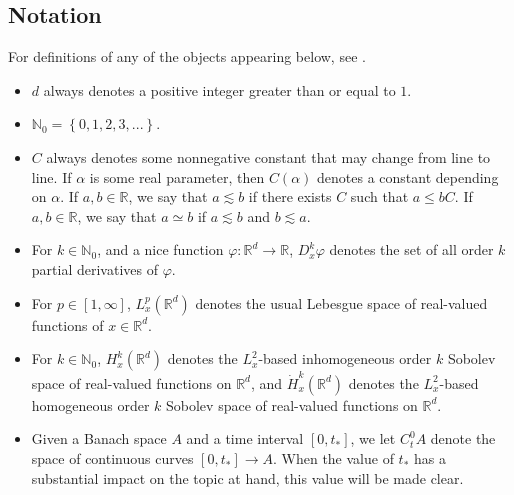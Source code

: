 \documentclass[twosided, 12pt]{article}
\numberwithin{equation}{section}
\theoremstyle{plain}
\begin{document}
\subsection{Notation}
\noindent For definitions of any of the objects appearing below, see \cite{Evans2010}.  
\begin{itemize}
\item $d$ always denotes a positive integer greater than or equal to $1$. 
\item $\mathbb{N}_0=\left\{0,1,2,3,...\right\}$.
\item $C$ always denotes some nonnegative constant that may change from line to line. If $\alpha$ is some real parameter, then $C(\alpha)$ denotes a constant depending on $\alpha$. If $a,b\in \mathbb{R}$, we say that $a\lesssim b$ if there exists $C$ such that $a\leq bC$. If $a,b\in \mathbb{R}$, we say that $a\simeq b$ if $a\lesssim b$ and $b\lesssim a$. 
\item For $k\in \mathbb{N}_0$, and a nice function $\varphi\colon \mathbb{R}^d\rightarrow \mathbb{R}$, $D^{k}_{x}\varphi$ denotes the set of all order $k$ partial derivatives of $\varphi$. 
    \item For $p\in \left[1,\infty\right]$, $L^{p}_{x}\left(\mathbb{R}^{d}\right)$ denotes the usual Lebesgue space of real-valued functions of $x\in \mathbb{R}^d$. 
   \item For $k\in \mathbb{N}_0$, $H^{k}_{x}\left(\mathbb{R}^d\right)$ denotes the $L^2_{x}$-based inhomogeneous order $k$ Sobolev space of real-valued functions on $\mathbb{R}^d$, and $\dot{H}^{k}_{x}\left(\mathbb{R}^d\right)$ denotes the $L^2_{x}$-based homogeneous order $k$ Sobolev space of real-valued functions on $\mathbb{R}^d$. 
   \item Given a Banach space $A$ and a time interval $[0,t_{*}]$, we let $C^0_t A$ denote the space of continuous curves $[0,t_{*}] \rightarrow A$. When the value of $t_{*}$ has a substantial impact on the topic at hand, this value will be made clear. 
    \end{itemize}
\end{document}

